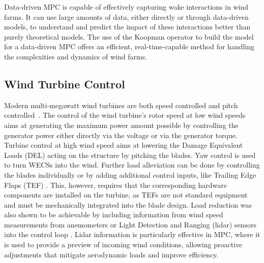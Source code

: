 Data-driven MPC is capable of effectively capturing wake interactions in wind farms. It can use large amounts of data, either directly or through data-driven models, to understand and predict the impact of these interactions better than purely theoretical models. The use of the Koopman operator \cite{koopman1931hamiltonian} to build the model for a data-driven MPC offers an efficient, real-time-capable method for handling the complexities and dynamics of wind farms.

\subsection{Wind Turbine Control} 
Modern multi-megawatt wind turbines are both speed controlled and pitch control\-led~\cite{wright2008advanced}. The control of the wind turbine's rotor speed at low wind speeds aims at generating the maximum power amount possible by controlling the generator power either directly via the voltage or via the generator torque. Turbine control at high wind speed aims at lowering the Damage Equivalent Loads (DEL) acting on the structure by pitching the blades. Yaw control is used to turn WECSs into the wind. Further load alleviation can be done by controlling the blades individually or by adding additional control inputs, like Trailing Edge Flaps (TEF) \cite{zhang2015parameter}. This, however, requires that the corresponding hardware components are installed on the turbine, as TEFs are not standard equipment and must be mechanically integrated into the blade design. Load reduction was also shown to be achievable by including information from wind speed measurements from anemometers or Light Detection and Ranging (lidar) sensors into the control loop \cite{schlipf2013nonlinear}. Lidar information is particularly effective in MPC, where it is used to provide a preview of incoming wind conditions, allowing proactive adjustments that mitigate aerodynamic loads and improve efficiency.

